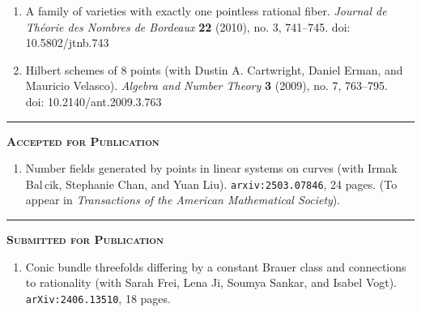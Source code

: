 \documentclass[12pt]{article}
\newcommand{\sectionheading}[1]
	{\bigskip %
	\noindent
	\hspace{-6.5mm}\textcolor{Gray}{\rule[.75mm]{21.5mm}{1mm}} %
	\hspace{.2mm}	%
	{\large{\textbf{\textsc{#1}}}} %
}
\begin{document}
\begin{enumerate}[itemsep=-1mm, leftmargin=24mm]
			\item
			{A family of varieties with exactly one pointless 
			rational fiber}.
			\textit{Journal de Th\'eorie des Nombres de Bordeaux}
			\textbf{22} (2010), no. 3, 741--745.
            doi: 10.5802/jtnb.743 
			
			\item
			{Hilbert schemes of $8$ points}
			(with Dustin A. Cartwright, Daniel Erman, and Mauricio Velasco). 
			\textit{Algebra and Number Theory} \textbf{3} (2009), no. 7,
			763--795. \\
            doi: 10.2140/ant.2009.3.763
				
		\end{enumerate}
	
    \sectionheading{Accepted for Publication}%
    
        \vspace{-1ex}
    
        \begin{enumerate}[resume, itemsep=-1mm,  leftmargin=24mm]

         \item Number fields generated by points in linear systems on curves (with Irmak Bal\,{c}ik, Stephanie Chan, and Yuan Liu). \texttt{arxiv:2503.07846}, 24 pages. (To appear in \textit{Transactions of the American Mathematical Society}).

    
         \end{enumerate}
	
	\sectionheading{Submitted for Publication}%

		\vspace{-1ex}

		\begin{enumerate}[resume, itemsep=-1mm,leftmargin=24mm]


\item Conic bundle threefolds differing by a constant Brauer class and connections to rationality (with Sarah Frei, Lena Ji, Soumya Sankar, and Isabel Vogt). \texttt{arXiv:2406.13510}, 18 pages.




        \end{enumerate}
\end{document}
